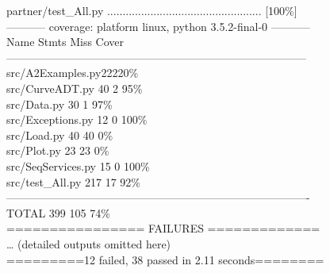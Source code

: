 \documentclass[12pt]{article}
\begin{document}
partner/test\_All.py ..................................................   [100\%]\\
----------- coverage: platform linux, python 3.5.2-final-0 -----------\\
Name \hspace{26ex}                        Stmts\hspace{4ex}    Miss\hspace{3ex}    Cover\\
---------------------------------------------------------------------------------\\
src/A2Examples.py\hspace{17ex}22\hspace{8ex}22\hspace{6ex}0\%\\
src/CurveADT.py     \hspace{17ex}            40 \hspace{8ex}2\hspace{4ex}   95\%\\
src/Data.py             \hspace{23ex}            30 \hspace{7ex}     1 \hspace{4ex}  97\%\\
src/Exceptions.py    \hspace{17ex}             12\hspace{8ex}      0 \hspace{3ex}   100\%\\
src/Load.py           \hspace{23ex}              40\hspace{7ex}     40\hspace{6ex}       0\%\\
src/Plot.py            \hspace{24ex}              23\hspace{7ex}     23 \hspace{5ex}      0\%\\
src/SeqServices.py   \hspace{17ex}           15\hspace{8ex}      0\hspace{4ex}      100\%\\
src/test\_All.py        \hspace{20ex}           217\hspace{7ex}      17 \hspace{4ex}     92\%\\
----------------------------------------------------------------------------------\\
TOTAL           \hspace{27ex}                   399 \hspace{5ex}    105  \hspace{3ex}   74\%\\
================ FAILURES =============\\
… (detailed outputs omitted here)\\
=========12 failed, 38 passed in 2.11 seconds========\\
\end{document}
